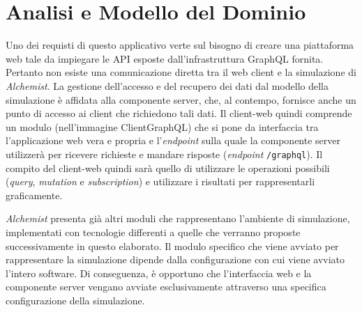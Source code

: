 \section{Analisi e Modello del Dominio}
Uno dei requisti di questo applicativo verte sul bisogno di creare una piattaforma web tale da impiegare le \ac{API} esposte dall'infrastruttura GraphQL fornita. Pertanto non esiste una comunicazione diretta tra il web client e la simulazione di \textit{Alchemist}. La gestione dell'accesso e del recupero dei dati dal modello della simulazione è affidata alla componente server, che, al contempo, fornisce anche un punto di accesso ai client che richiedono tali dati.
Il client-web quindi comprende un modulo (nell'immagine ClientGraphQL) che si pone da interfaccia tra l'applicazione web vera e propria e l'\textit{endpoint } sulla quale la componente server utilizzerà per ricevere richieste e mandare risposte (\textit{endpoint} \texttt{/graphql}). 
Il compito del client-web quindi sarà quello di utilizzare le operazioni possibili (\textit{query}, \textit{mutation} e \textit{subscription}) e utilizzare i risultati per rappresentarli graficamente.

\textit{Alchemist} presenta già altri moduli che rappresentano l'ambiente di simulazione, implementati con tecnologie differenti a quelle che verranno proposte successivamente in questo elaborato. Il modulo specifico che viene avviato per rappresentare la simulazione dipende dalla configurazione con cui viene avviato l'intero software. Di conseguenza, è opportuno che l'interfaccia web e la componente server vengano avviate esclusivamente attraverso una specifica configurazione della simulazione.


